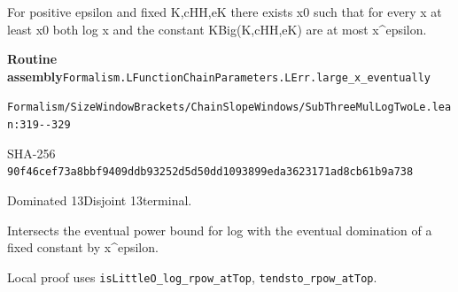 
\begin{formalstatement}[D550]\label{decomp:D550}
For positive epsilon and fixed K,cHH,eK there exists x0 such that for every x at least x0 both log x and the constant KBig(K,cHH,eK) are at most x\textasciicircum{}epsilon.
\end{formalstatement}
{\small\raggedright\noindent\textsf{\bfseries Routine assembly}\quad \nolinkurl{Formalism.LFunctionChainParameters.LErr.large_x_eventually}\par\noindent \nolinkurl{Formalism/SizeWindowBrackets/ChainSlopeWindows/SubThreeMulLogTwoLe.lean:319--329}\par\noindent SHA-256 \nolinkurl{90f46cef73a8bbf9409ddb93252d5d50dd1093899eda3623171ad8cb61b9a738}\par\noindent Dominated 13\quad Disjoint 13\quad terminal.\par}
Intersects the eventual power bound for log with the eventual domination of a fixed constant by x\textasciicircum{}epsilon.
{\small\raggedright Local proof uses \nolinkurl{isLittleO_log_rpow_atTop}, \nolinkurl{tendsto_rpow_atTop}.\par}
